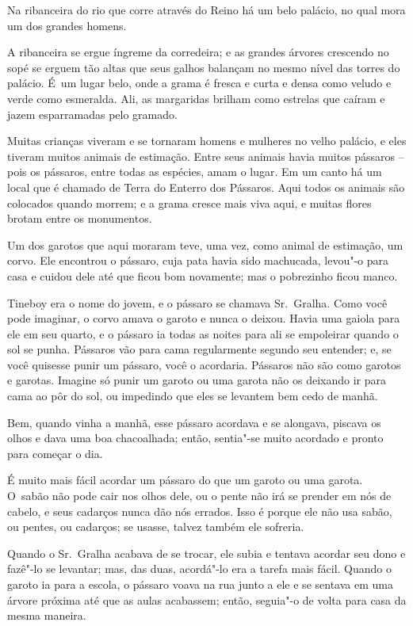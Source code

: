  

Na ribanceira do rio que corre através do Reino há um belo palácio, no
qual mora um dos grandes homens.

A ribanceira se ergue íngreme da corredeira; e as grandes árvores
crescendo no sopé se erguem tão altas que seus galhos balançam no mesmo
nível das torres do palácio. É~um lugar belo, onde a grama é fresca e
curta e densa como veludo e verde como esmeralda. Ali, as margaridas
brilham como estrelas que caíram e jazem esparramadas pelo gramado.

Muitas crianças viveram e se tornaram homens e mulheres no velho
palácio, e eles tiveram muitos animais de estimação. Entre seus animais
havia muitos pássaros -- pois os pássaros, entre todas as espécies, amam
o lugar. Em um canto há um local que é chamado de Terra do Enterro dos
Pássaros. Aqui todos os animais são colocados quando morrem; e a grama
cresce mais viva aqui, e muitas flores brotam entre os monumentos.

Um dos garotos que aqui moraram teve, uma vez, como animal de estimação,
um corvo. Ele encontrou o pássaro, cuja pata havia sido machucada,
levou"-o para casa e cuidou dele até que ficou bom novamente; mas o
pobrezinho ficou manco.

Tineboy era o nome do jovem, e o pássaro se chamava Sr.~Gralha. Como
você pode imaginar, o corvo amava o garoto e nunca o deixou. Havia uma
gaiola para ele em seu quarto, e o pássaro ia todas as noites para ali
se empoleirar quando o sol se punha. Pássaros vão para cama regularmente
segundo seu entender; e, se você quisesse punir um pássaro, você o
acordaria. Pássaros não são como garotos e garotas. Imagine só punir um
garoto ou uma garota não os deixando ir para cama ao pôr do sol, ou
impedindo que eles se levantem bem cedo de manhã.

Bem, quando vinha a manhã, esse pássaro acordava e se alongava, piscava
os olhos e dava uma boa chacoalhada; então, sentia"-se muito acordado e
pronto para começar o dia.

É muito mais fácil acordar um pássaro do que um garoto ou uma garota. O~sabão não pode cair nos olhos dele, ou o pente não irá se prender em nós
de cabelo, e seus cadarços nunca dão nós errados. Isso é porque ele não
usa sabão, ou pentes, ou cadarços; se usasse, talvez também ele
sofreria.

Quando o Sr.~Gralha acabava de se trocar, ele subia e tentava acordar
seu dono e fazê"-lo se levantar; mas, das duas, acordá"-lo era a tarefa
mais fácil. Quando o garoto ia para a escola, o pássaro voava na rua
junto a ele e se sentava em uma árvore próxima até que as aulas
acabassem; então, seguia"-o de volta para casa da mesma maneira.

